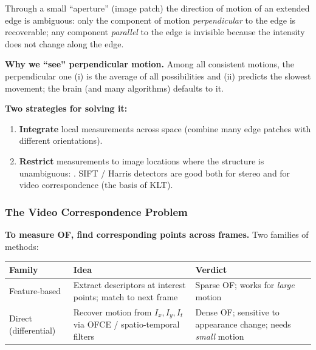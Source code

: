 \begin{defbox}
Through a small ``aperture'' (image patch) the direction of motion of an extended edge is ambiguous: only the component of motion \emph{perpendicular} to the edge is recoverable; any component \emph{parallel} to the edge is invisible because the intensity does not change along the edge.
\end{defbox}

\textbf{Why we ``see'' perpendicular motion.} Among all consistent motions, the perpendicular one (i) is the average of all possibilities and (ii) predicts the slowest movement; the brain (and many algorithms) defaults to it.

\textbf{Two strategies for solving it:}
\begin{enumerate}
  \item \textbf{Integrate} local measurements across space (combine many edge patches with different orientations).
  \item \textbf{Restrict} measurements to image locations where the structure is unambiguous: . SIFT / Harris detectors are good both for stereo and for video correspondence (the basis of KLT).
\end{enumerate}

\bigseparator

\subsubsection{The Video Correspondence Problem}

\textbf{To measure OF, find corresponding points across frames.} Two families of methods:

\begin{center}
\renewcommand{\arraystretch}{1.3}
\begin{tabular}{@{} l p{4.8cm} p{5.5cm} @{}}
\toprule
\textbf{Family} & \textbf{Idea} & \textbf{Verdict} \\
\midrule
Feature-based & Extract descriptors at interest points; match to next frame & Sparse OF; works for \emph{large} motion \\
Direct (differential) & Recover motion from $I_x,I_y,I_t$ via OFCE / spatio-temporal filters & Dense OF; sensitive to appearance change; needs \emph{small} motion \\
\bottomrule
\end{tabular}
\end{center}

